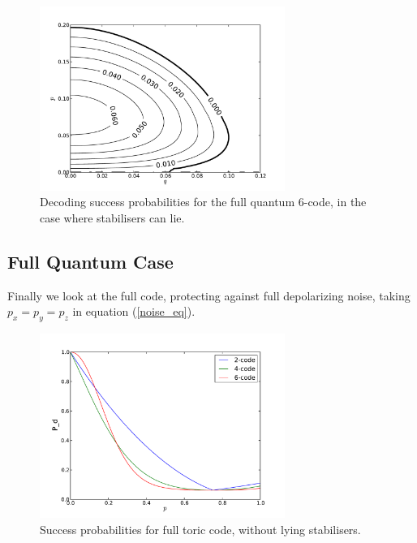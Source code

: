 \begin{figure}[htb]
  \begin{center}
    \includegraphics[width=8cm]{assets/y_lying.pdf}
  \end{center}
  \caption{Decoding success probabilities for the full quantum $6$-code, in the case where stabilisers can lie.}
  \label{y_lying}
\end{figure}

\subsection{Full Quantum Case}

Finally we look at the full code, protecting against full depolarizing noise, taking $p_x = p_y = p_z$ in equation (\ref{noise_eq}). 

\begin{figure}[htb]
  \begin{center}
    \includegraphics[width=8cm]{assets/full_truthful.pdf}
  \end{center}
  \caption{Success probabilities for full toric code, without lying stabilisers.}
  \label{full_truthful}
\end{figure}

